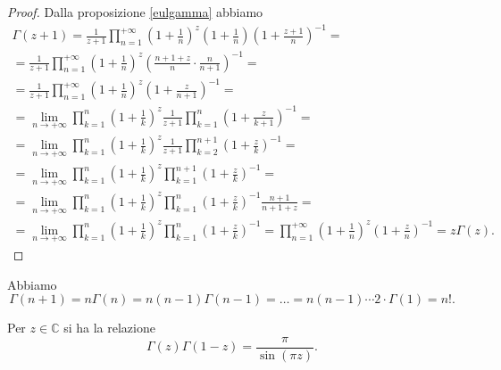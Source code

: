 \begin{proof}
  Dalla proposizione \ref{eulgamma} abbiamo
  \begin{gather*}
    \Gamma(z+1)=\frac{1}{z+1}\prod_{n=1}^{+\infty} \left(1+\frac{1}{n}\right)^z\left(1+\frac{1}{n}\right)\left(1+\frac{z+1}{n}\right)^{-1}= \\
    =\frac{1}{z+1}\prod_{n=1}^{+\infty}\left(1+\frac{1}{n}\right)^z\left(\frac{n+1+z}{n}\cdot\frac{n}{n+1}\right)^{-1}=\\
    =\frac{1}{z+1}\prod_{n=1}^{+\infty}\left(1+\frac{1}{n}\right)^z\left(1+\frac{z}{n+1}\right)^{-1}=\\
    =\lim_{n \longrightarrow +\infty} \prod_{k=1}^n \left(1+\frac{1}{k}\right)^z\frac{1}{z+1}\prod_{k=1}^n\left(1+\frac{z}{k+1}\right)^{-1}=\\
    =\lim_{n \longrightarrow +\infty}\prod_{k=1}^n\left(1+\frac{1}{k}\right)^z\frac{1}{z+1}\prod_{k=2}^{n+1}\left(1+\frac{z}{k}\right)^{-1}=\\
    =\lim_{n \longrightarrow +\infty}\prod_{k=1}^n\left(1+\frac{1}{k}\right)^z\prod_{k=1}^{n+1}\left(1+\frac{z}{k}\right)^{-1}= \\
    =\lim_{n \longrightarrow +\infty}\prod_{k=1}^n\left(1+\frac{1}{k}\right)^z\prod_{k=1}^n\left(1+\frac{z}{k}\right)^{-1}\frac{n+1}{n+1+z}=\\
    =\lim_{n \longrightarrow +\infty}\prod_{k=1}^n\left(1+\frac{1}{k}\right)^z\prod_{k=1}^n\left(1+\frac{z}{k}\right)^{-1}=\prod_{n=1}^{+\infty}\left(1+\frac{1}{n}\right)^z\left(1+\frac{z}{n}\right)^{-1}=z\Gamma(z).
  \end{gather*}
\end{proof}

\begin{oss}
  Abbiamo
  $$\Gamma(n+1)=n\Gamma(n)=n(n-1)\Gamma(n-1)=\dots=n(n-1)\cdots2\cdot\Gamma(1)=n!.$$
\end{oss}

\begin{prop} \label{gammaze1-z}
  Per $z \in \mathbb{C}$ si ha la relazione
  \begin{equation}
    \Gamma(z)\Gamma(1-z)=\frac{\pi}{\sin(\pi z)}.
  \end{equation}
\end{prop}

